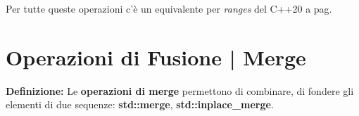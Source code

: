 \fleuron

\textsf{\small Per tutte queste operazioni c'è un equivalente per \emph{ranges} del C++20 a pag. \pageref{ranges}} \\




\newpage

\section{Operazioni di Fusione | Merge}

\textsf{\small \textbf{Definizione: } Le \textbf{operazioni di merge} permettono di combinare, di fondere gli elementi di due sequenze: \textbf{std::merge}, \textbf{std::inplace\_merge}.} \\

